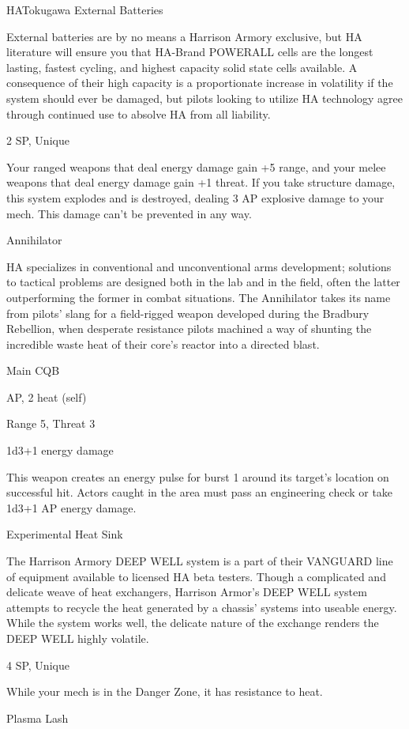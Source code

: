 \begin{mech}{HA}{Tokugawa}
External Batteries

External batteries are by no means a Harrison Armory exclusive, but HA literature will ensure you that HA-Brand POWERALL cells are the longest lasting, fastest cycling, and highest capacity solid state cells available. A consequence of their high capacity is a proportionate increase in volatility if the system should ever be damaged, but pilots looking to utilize HA technology agree through continued use to absolve HA from all liability.

2 SP, Unique

Your ranged weapons that deal energy damage gain +5 range, and your melee weapons that deal energy damage gain +1 threat. If you take structure damage, this system explodes and is destroyed, dealing 3 AP explosive damage to your mech. This damage can’t be prevented in any way.


Annihilator

HA specializes in conventional and unconventional arms development; solutions to tactical problems are designed both in the lab and in the field, often the latter outperforming the former in combat situations. The Annihilator takes its name from pilots’ slang for a field-rigged weapon developed during the Bradbury Rebellion, when desperate resistance pilots machined a way of shunting the incredible waste heat of their core’s reactor into a directed blast.

Main CQB

AP, 2 heat (self)

Range 5, Threat 3

1d3+1 energy damage

This weapon creates an energy pulse for burst 1 around its target’s location on successful hit. Actors caught in the area must pass an engineering check or take 1d3+1 AP energy damage.


Experimental Heat Sink

The Harrison Armory DEEP WELL system is a part of their VANGUARD line of equipment available to licensed HA beta testers. Though a complicated and delicate weave of heat exchangers, Harrison Armor’s DEEP WELL system attempts to recycle the heat generated by a chassis’ systems into useable energy. While the system works well, the delicate nature of the exchange renders the DEEP WELL highly volatile.

4 SP, Unique

While your mech is in the Danger Zone, it has resistance to heat.


Plasma Lash


\end{mech}
